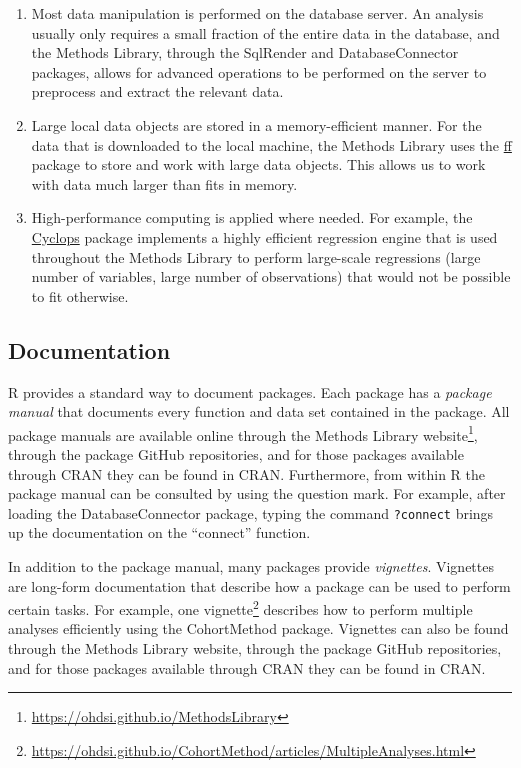 \documentclass[11pt]{book}
\providecommand{\tightlist}{%
  \setlength{\itemsep}{0pt}\setlength{\parskip}{0pt}}
\let\rmarkdownfootnote\footnote%
\def\footnote{\protect\rmarkdownfootnote}
\theoremstyle{definition}
\theoremstyle{definition}
\theoremstyle{definition}
\theoremstyle{remark}
\begin{document}
\begin{enumerate}
\def\labelenumi{\arabic{enumi}.}
\tightlist
\item
  Most data manipulation is performed on the database server. An
  analysis usually only requires a small fraction of the entire data in
  the database, and the Methods Library, through the SqlRender and
  DatabaseConnector packages, allows for advanced operations to be
  performed on the server to preprocess and extract the relevant data.
\item
  Large local data objects are stored in a memory-efficient manner. For
  the data that is downloaded to the local machine, the Methods Library
  uses the \href{https://cran.r-project.org/web/packages/ff}{ff} package
  to store and work with large data objects. This allows us to work with
  data much larger than fits in memory.
\item
  High-performance computing is applied where needed. For example, the
  \href{https://ohdsi.github.io/Cyclops/}{Cyclops} package implements a
  highly efficient regression engine that is used throughout the Methods
  Library to perform large-scale regressions (large number of variables,
  large number of observations) that would not be possible to fit
  otherwise.
\end{enumerate}

\subsection{Documentation}\label{documentation-1}

R provides a standard way to document packages. Each package has a
\emph{package manual} that documents every function and data set
contained in the package. All package manuals are available online
through the Methods Library website\footnote{\url{https://ohdsi.github.io/MethodsLibrary}},
through the package GitHub repositories, and for those packages
available through CRAN they can be found in CRAN. Furthermore, from
within R the package manual can be consulted by using the question mark.
For example, after loading the DatabaseConnector package, typing the
command \texttt{?connect} brings up the documentation on the ``connect''
function.

In addition to the package manual, many packages provide
\emph{vignettes}. Vignettes are long-form documentation that describe
how a package can be used to perform certain tasks. For example, one
vignette\footnote{\url{https://ohdsi.github.io/CohortMethod/articles/MultipleAnalyses.html}}
describes how to perform multiple analyses efficiently using the
CohortMethod package. Vignettes can also be found through the Methods
Library website, through the package GitHub repositories, and for those
packages available through CRAN they can be found in CRAN.
\end{document}
